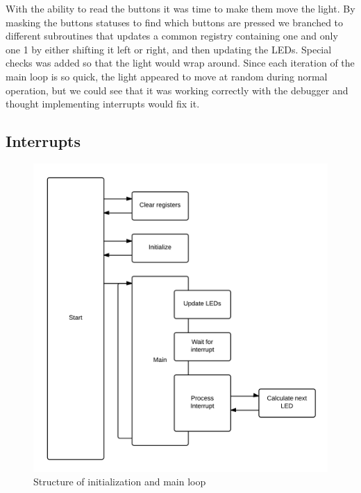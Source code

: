 With the ability to read the buttons it was time to make them move the light. By masking the buttons statuses to find which buttons are pressed we branched to different subroutines that updates a common registry containing one and only one 1 by either shifting it left or right, and then updating the LEDs. Special checks was added so that the light would wrap around. Since each iteration of the main loop is so quick, the light appeared to move at random during normal operation, but we could see that it was working correctly with the debugger and thought implementing interrupts would fix it.
\subsection{Interrupts}

\begin{figure}
  \centering
    \includegraphics[width=0.4\textheight]{mainstructure}
 \caption{Structure of initialization and main loop}
 \label{mainstruct}
\end{figure}

